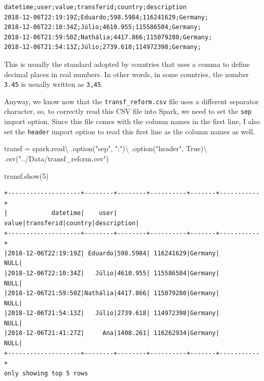 \documentclass[
  11pt,
  letterpaper,
  DIV=11,
  numbers=noendperiod]{scrreprt}
\newenvironment{Shaded}{\begin{snugshade}}{\end{snugshade}}
\newcommand{\DecValTok}[1]{\textcolor[rgb]{0.68,0.00,0.00}{#1}}
\newcommand{\NormalTok}[1]{\textcolor[rgb]{0.00,0.23,0.31}{#1}}
\newcommand{\OperatorTok}[1]{\textcolor[rgb]{0.37,0.37,0.37}{#1}}
\newcommand{\StringTok}[1]{\textcolor[rgb]{0.13,0.47,0.30}{#1}}
\newcommand{\VariableTok}[1]{\textcolor[rgb]{0.07,0.07,0.07}{#1}}
\begin{document}
\begin{verbatim}
datetime;user;value;transferid;country;description
2018-12-06T22:19:19Z;Eduardo;598.5984;116241629;Germany;
2018-12-06T22:10:34Z;Júlio;4610.955;115586504;Germany;
2018-12-06T21:59:50Z;Nathália;4417.866;115079280;Germany;
2018-12-06T21:54:13Z;Júlio;2739.618;114972398;Germany;
\end{verbatim}

This is usually the standard adopted by countries that uses a comma to
define decimal places in real numbers. In other words, in some
countries, the number \texttt{3.45} is usually written as \texttt{3,45}.

Anyway, we know now that the \texttt{transf\_reform.csv} file uses a
different separator character, so, to correctly read this CSV file into
Spark, we need to set the \texttt{sep} import option. Since this file
comes with the column names in the first line, I also set the
\texttt{header} import option to read this first line as the column
names as well.

\begin{Shaded}
\begin{Highlighting}[]
\NormalTok{transf }\OperatorTok{=}\NormalTok{ spark.read}\OperatorTok{\textbackslash{}}
\NormalTok{  .option(}\StringTok{"sep"}\NormalTok{, }\StringTok{";"}\NormalTok{)}\OperatorTok{\textbackslash{}}
\NormalTok{  .option(}\StringTok{"header"}\NormalTok{, }\VariableTok{True}\NormalTok{)}\OperatorTok{\textbackslash{}}
\NormalTok{  .csv(}\StringTok{"../Data/transf\_reform.csv"}\NormalTok{)}
  
\NormalTok{transf.show(}\DecValTok{5}\NormalTok{)}
\end{Highlighting}
\end{Shaded}

\begin{verbatim}
+--------------------+--------+--------+----------+-------+-----------+
|            datetime|    user|   value|transferid|country|description|
+--------------------+--------+--------+----------+-------+-----------+
|2018-12-06T22:19:19Z| Eduardo|598.5984| 116241629|Germany|       NULL|
|2018-12-06T22:10:34Z|   Júlio|4610.955| 115586504|Germany|       NULL|
|2018-12-06T21:59:50Z|Nathália|4417.866| 115079280|Germany|       NULL|
|2018-12-06T21:54:13Z|   Júlio|2739.618| 114972398|Germany|       NULL|
|2018-12-06T21:41:27Z|     Ana|1408.261| 116262934|Germany|       NULL|
+--------------------+--------+--------+----------+-------+-----------+
only showing top 5 rows
\end{verbatim}
\end{document}
